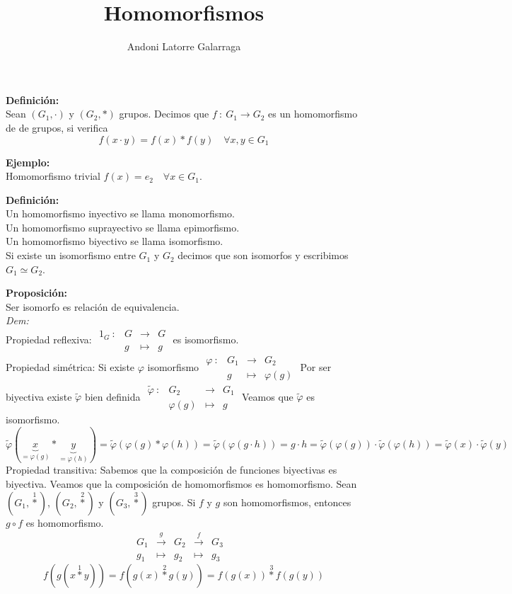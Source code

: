 \documentclass{article}
\title{Homomorfismos}
\author{Andoni Latorre Galarraga}
\date{}
\begin{document}
\setlength{\parindent}{0cm}
\maketitle


\textbf{Definición:}\\
Sean $(G_1,\cdot)$ y $(G_2,*)$ grupos. Decimos que $f\::\:G_1\longrightarrow G_2$ es un homomorfismo de de grupos, si verifica
$$
f(x\cdot y)=f(x)*f(y)\quad\forall x,y\in G_1
$$


\textbf{Ejemplo: }\\
Homomorfismo trivial $f(x)=e_2 \quad \forall x\in G_1$.


\textbf{Definición: }\\
Un homomorfismo inyectivo se llama monomorfismo.\\
Un homomorfismo suprayectivo se llama epimorfismo.\\
Un homomorfismo biyectivo se llama isomorfismo.\\
Si existe un isomorfismo entre $G_1$ y $G_2$ decimos que son isomorfos y escribimos $G_1\simeq G_2$.

\textbf{Proposición:}\\
Ser isomorfo es relación de equivalencia.\\
\textit{Dem:}\\
Propiedad reflexiva: $\begin{array}{cccc}
    1_G\::&G&\longrightarrow&G\\
        &g&\longmapsto&g
\end{array}$ es isomorfismo.\\
Propiedad simétrica: Si existe $\varphi$ isomorfismo $\begin{array}{cccc}
    \varphi\::&G_1&\longrightarrow&G_2\\
        &g&\longmapsto&\varphi(g)
\end{array}$ Por ser biyectiva existe $\tilde{\varphi}$ bien definida $\begin{array}{cccc}
    \tilde{\varphi}\::&G_2&\longrightarrow&G_1\\
        &\varphi(g)&\longmapsto&g
\end{array}$ Veamos que $\tilde{\varphi}$ es isomorfismo.
$$
\tilde{\varphi}(\underbrace{x}_{=\varphi(g)}*\underbrace{y}_{=\varphi(h)})=\tilde{\varphi}(\varphi(g)*\varphi(h))=\tilde{\varphi}(\varphi(g\cdot h))=g\cdot h = \tilde{\varphi}(\varphi(g))\cdot\tilde{\varphi}(\varphi(h))=\tilde{\varphi}(x)\cdot\tilde{\varphi}(y)
$$
Propiedad transitiva: Sabemos que la composición de funciones biyectivas es biyectiva. Veamos que la composición de homomorfismos es homomorfismo. Sean $(G_1, \overset{1}{*})$, $(G_2, \overset{2}{*})$ y $(G_3, \overset{3}{*})$ grupos. Si $f$ y $g$ son homomorfismos, entonces $g\circ f$ es homomorfismo.
$$
\begin{array}{cccccc}
    G_1 & \overset{g}{\longrightarrow} & G_2 & \overset{f}{\longrightarrow} & G_3\\
    g_1 &\longmapsto&g_2&\longmapsto&g_3
     & 
\end{array}
$$
$$
f(g(x\overset{1}{*}y))=f(g(x)\overset{2}{*}g(y))=f(g(x))\overset{3}{*}f(g(y))
$$
\end{document}

